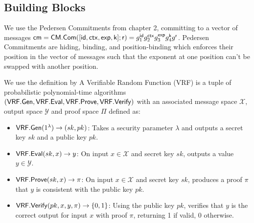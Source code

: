 \subsection{Building Blocks}
We use the Pedersen Commitments from chapter 2, committing to a vector of messages $\mathsf{cm} = \mathsf{CM.Com}([\mathsf{id}, \mathsf{ctx}, \mathsf{exp}, \mathsf{k}];\mathsf{r}) = g_1^{\mathsf{id}} g_2^{\mathsf{ctx}} g_3^{\mathsf{exp}} g_4^{\mathsf{k}} g^{\mathsf{r}}$. Pedersen Commitments are hiding, binding, and position-binding which enforces their position in the vector of messages such that the exponent at one position can't be swapped with another position. 






\begin{definition}
We use the definition by \cite{bitansky_verifiable_2020} A Verifiable Random Function (VRF) is a tuple of probabilistic polynomial-time algorithms $(\mathsf{VRF.Gen}, \mathsf{VRF.Eval}, \mathsf{VRF.Prove}, \mathsf{VRF.Verify})$ with an associated message space $\mathcal{X}$, output space $\mathcal{Y}$ and proof space $\Pi$ defined as:
\begin{itemize}
    \item $\mathsf{VRF.Gen}(1^\lambda) \to (sk, pk)$: Takes a security parameter $\lambda$ and outputs a secret key $sk$ and a public key $pk$.
    
    \item $\mathsf{VRF.Eval}(sk,x) \to y$: On input $x \in \mathcal{X}$ and secret key $sk$, outputs a value $y \in \mathcal{Y}$.
    
    \item $\mathsf{VRF.Prove}(sk,x) \to \pi$: On input $x \in \mathcal{X}$ and secret key $sk$, produces a proof $\pi$ that $y$ is consistent with the public key $pk$.
    
    \item $\mathsf{VRF.Verify}(pk,x, y, \pi) \to \{0,1\}$: Using the public key $pk$, verifies that $y$ is the correct output for input $x$ with proof $\pi$, returning 1 if valid, 0 otherwise.
\end{itemize}
    
\end{definition}

